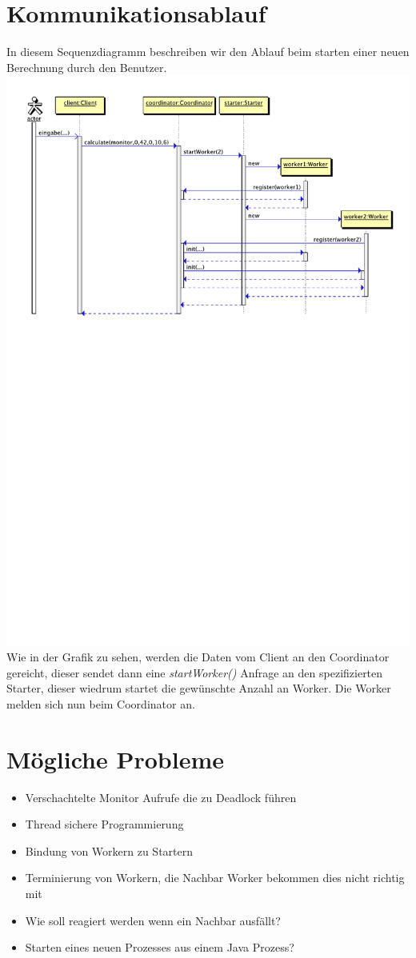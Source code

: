 \documentclass{article}
\begin{document}
\section{Kommunikationsablauf}
In diesem Sequenzdiagramm beschreiben wir den Ablauf beim starten einer neuen Berechnung durch den Benutzer.\\
\includegraphics[scale=.6]{spawn_workers}\\
Wie in der Grafik zu sehen, werden die Daten vom Client an den Coordinator gereicht, dieser sendet dann eine \textit{startWorker()} Anfrage an den spezifizierten Starter, dieser wiedrum startet die gewünschte Anzahl an Worker. Die Worker melden sich nun beim Coordinator an.

\section{Mögliche Probleme}
\begin{itemize}
	\item Verschachtelte Monitor Aufrufe die zu Deadlock führen
	\item Thread sichere Programmierung
	\item Bindung von Workern zu Startern
	\item Terminierung von Workern, die Nachbar Worker bekommen dies nicht richtig mit
	\item Wie soll reagiert werden wenn ein Nachbar ausfällt?
	\item Starten eines neuen Prozesses aus einem Java Prozess?
\end{itemize}
\end{document}
